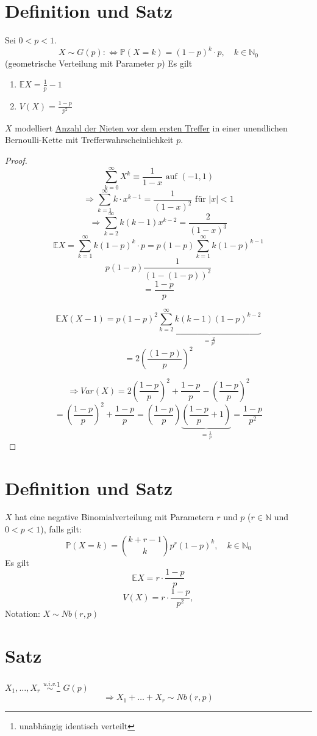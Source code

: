 \documentclass[a4paper,11pt,notitlepage]{report}
\newcommand{\N}{{\ensuremath{\mathbb{N}}}}
\newcommand{\Prim}{{\ensuremath{\mathbb{P}}}}
\newcommand{\E}{{\ensuremath{\mathbb{E}}}}
\begin{document}
\section{Definition und Satz}
Sei $0 < p < 1$.
$$X \sim G(p) :\Leftrightarrow \Prim(X=k) = (1-p)^k \cdot p, \quad k \in \N_0$$
(geometrische Verteilung mit Parameter $p$)
\newline
Es gilt
\begin{enumerate}
	\item $\E X = \frac{1}{p} -1$
	\item $V(X) = \frac{1-p}{p^2}$
\end{enumerate}
$X$ modelliert \underline{Anzahl der Nieten vor dem ersten Treffer} in einer unendlichen Bernoulli-Kette mit Trefferwahrscheinlichkeit $p$.

\begin{proof}
	$$\sum\limits_{k=0}^\infty{X^k} \equiv \frac{1}{1-x} \text{ auf } (-1,1)$$
	$$\Rightarrow \sum\limits_{k=1}^\infty{k \cdot x^{k-1}} = \frac{1}{(1-x)^2} \text{ für } |x|<1$$
	$$\Rightarrow \sum\limits_{k=2}^\infty{k(k-1)x^{k-2}} = \frac{2}{(1-x)^3}$$
	$$\E X = \sum\limits_{k=1}^\infty{k (1-p)^{k} \cdot p} = p (1-p) \sum\limits_{k=1}^\infty {k (1-p)^{k-1}}$$
	$$p (1-p) \frac{1}{(1-(1-p))^2}$$
	$$= \frac{1-p}{p}$$

	$$\E X (X-1) = p(1-p)^2 \underbrace{\sum\limits_{k=2}^\infty{k (k-1) (1-p)^{k-2}}}_{= \frac{2}{p^3}}$$
	$$= 2\left(\frac{(1-p)}{p}\right)^2$$

	$$\Rightarrow Var(X) = 2 \left(\frac{1-p}{p}\right)^2 + \frac{1-p}{p} - \left(\frac{1-p}{p}\right)^2$$	
	$$= \left(\frac{1-p}{p}\right)^2 + \frac{1-p}{p} = \left( \frac{1-p}{p} \right) \underbrace{\left(\frac{1-p}{p}+1\right)}_{=\frac{1}{p}}= \frac{1-p}{p^2}$$
\end{proof}

\section{Definition und Satz}
$X$ hat eine negative Binomialverteilung mit Parametern $r$ und $p$ ($r \in \N$ und $0 < p < 1$), falls gilt:
$$\Prim(X=k) = {k+r-1 \choose k} p^r (1-p)^k, \quad k \in \N_0$$
Es gilt 
$$\E X = r \cdot \frac{1-p}{p}$$
$$V(X) = r \cdot \frac{1-p}{p^2},$$
Notation: $X \sim Nb(r,p)$

\section{Satz}
$X_1, \ldots, X_r$ $\overset{u.i.v.}{\sim}$\footnote{unabhängig identisch verteilt} $G(p)$
$$\Rightarrow X_1 + \ldots + X_r \sim Nb(r,p)$$
\end{document}
